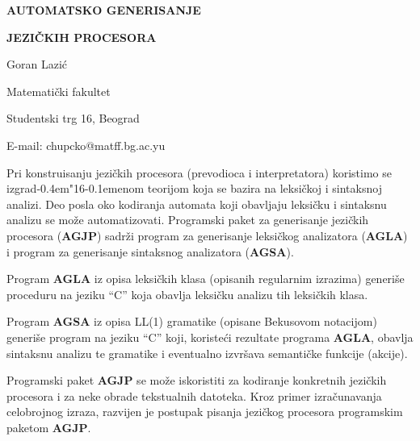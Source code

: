 \documentclass[a4paper]{article}
\def\d{d\kern-0.4em\char"16\kern-0.1em}
\begin{document}
    \pagestyle{empty}
    \centerline{{\bf \Large AUTOMATSKO GENERISANJE}}
    \centerline{{\bf \Large JEZI\v{C}KIH PROCESORA}}
    \vspace{1em}
    \centerline{Goran Lazi\'c}
    \centerline{Matemati\v{c}ki fakultet}
    \centerline{Studentski trg 16, Beograd}
    \centerline{E-mail: chupcko@matff.bg.ac.yu}
    \vspace{1em}
    Pri konstruisanju jezi\v ckih procesora (prevodioca i interpretatora)
    koristimo se izgra\d enom teorijom koja se bazira na leksi\v ckoj i
    sintaksnoj analizi.
    Deo posla oko kodiranja automata koji obavljaju leksi\v cku i sintaksnu
    analizu se mo\v ze auto\-matizovati.
    Programski paket za generisanje jezi\v ckih procesora ({\bf AGJP})
    sadr\v zi program za generisanje leksi\v ckog analizatora ({\bf AGLA})
    i program za generisanje sintaksnog analizatora ({\bf AGSA}).

    Program {\bf AGLA} iz opisa leksi\v ckih klasa (opisanih regularnim
    izrazima) generi\v se proceduru na jeziku ``C'' koja obavlja leksi\v cku
    analizu tih leksi\v ckih klasa.

    Program {\bf AGSA} iz opisa LL(1) gramatike (opisane Bekusovom notacijom)
    gene\-ri\v se program na jeziku ``C'' koji, koriste\'ci rezultate programa
    {\bf AGLA}, oba\-vlja sintaksnu analizu te gramatike i eventualno
    izvr\v sava semanti\v{c}ke funkcije (akcije).

    Programski paket {\bf AGJP} se mo\v ze iskoristiti za kodiranje konkretnih
    jezi\v ckih procesora i za neke obrade tekstualnih datoteka.
    Kroz primer izra\v cunavanja celo\-brojnog izraza, razvijen je postupak
    pisanja jezi\v ckog procesora programskim paketom {\bf AGJP}.
  
\end{document}
